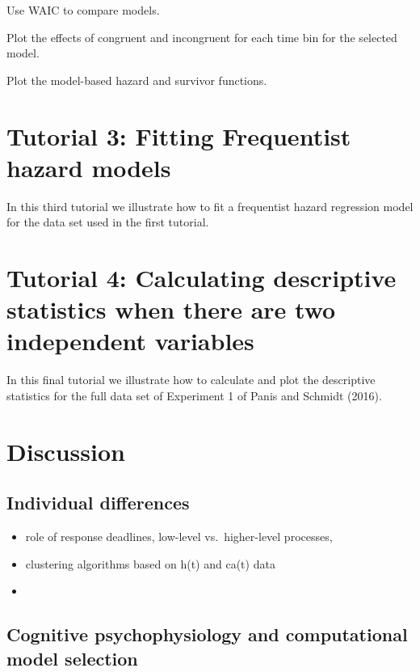 \documentclass[
  man,floatsintext]{apa6}
\providecommand{\tightlist}{%
  \setlength{\itemsep}{0pt}\setlength{\parskip}{0pt}}
\begin{document}
Use WAIC to compare models.

Plot the effects of congruent and incongruent for each time bin for the selected model.

Plot the model-based hazard and survivor functions.

\section{Tutorial 3: Fitting Frequentist hazard models}\label{tutorial-3-fitting-frequentist-hazard-models}

In this third tutorial we illustrate how to fit a frequentist hazard regression model for the data set used in the first tutorial.

\section{Tutorial 4: Calculating descriptive statistics when there are two independent variables}\label{tutorial-4-calculating-descriptive-statistics-when-there-are-two-independent-variables}

In this final tutorial we illustrate how to calculate and plot the descriptive statistics for the full data set of Experiment 1 of Panis and Schmidt (2016).

\section{Discussion}\label{discussion}

\subsection{Individual differences}\label{individual-differences}

\begin{itemize}
\tightlist
\item
  role of response deadlines, low-level vs.~higher-level processes,
\item
  clustering algorithms based on h(t) and ca(t) data
\item
\end{itemize}

\subsection{Cognitive psychophysiology and computational model selection}\label{cognitive-psychophysiology-and-computational-model-selection}
\end{document}
